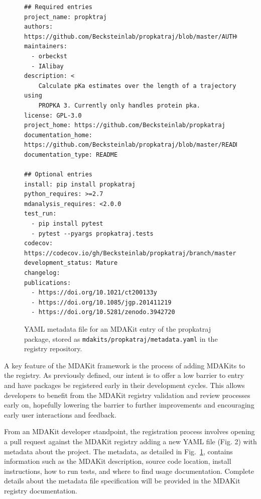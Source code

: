 \documentclass[9pt,whitepaper]{livecoms}
\begin{document}
\begin{figure}[hbt!]
    \centering
    \begin{verbatim}
## Required entries
project_name: propktraj
authors: https://github.com/Becksteinlab/propkatraj/blob/master/AUTHORS
maintainers:
  - orbeckst
  - IAlibay
description: <
    Calculate pKa estimates over the length of a trajectory using
    PROPKA 3. Currently only handles protein pka.
license: GPL-3.0
project_home: https://github.com/Becksteinlab/propkatraj
documentation_home: https://github.com/Becksteinlab/propkatraj/blob/master/README.md
documentation_type: README

## Optional entries
install: pip install propkatraj
python_requires: >=2.7
mdanalysis_requires: <2.0.0
test_run: 
  - pip install pytest
  - pytest --pyargs propkatraj.tests
codecov: https://codecov.io/gh/Becksteinlab/propkatraj/branch/master
development_status: Mature
changelog: 
publications:
  - https://doi.org/10.1021/ct200133y
  - https://doi.org/10.1085/jgp.201411219
  - https://doi.org/10.5281/zenodo.3942720
    \end{verbatim}
    \caption{YAML metadata file for an MDAKit entry of the propkatraj package, stored as \texttt{mdakits/propkatraj/metadata.yaml} in the registry repository.}
    \label{fig:metadatapropkatraj}
\end{figure}

A key feature of the MDAKit framework is the process of adding MDAKits to the registry. As previously defined, our intent is to offer a low barrier to entry and have packages be registered early in their development cycles. This allows developers to benefit from the MDAKit registry validation and review processes early on, hopefully lowering the barrier to further improvements and encouraging early user interactions and feedback.
 
From an MDAKit developer standpoint, the registration process involves opening a pull request against the MDAKit registry adding a new YAML file (Fig. 2) with metadata about the project. The metadata, as detailed in Fig.~\ref{fig:metadatapropkatraj}, contains information such as the MDAKit description, source code location, install instructions, how to run tests, and where to find usage documentation. Complete details about the metadata file specification will be provided in the MDAKit registry documentation.
\end{document}
